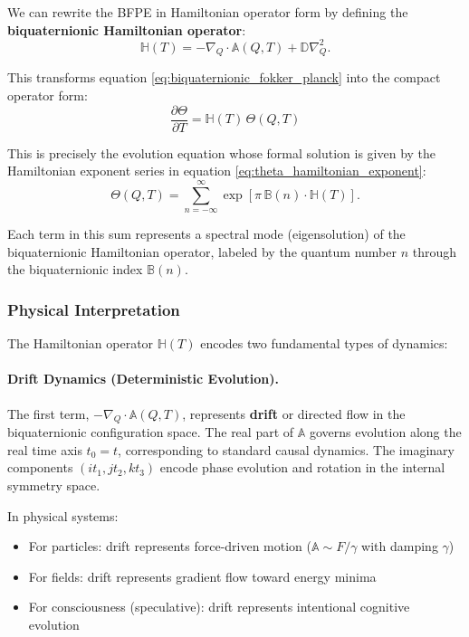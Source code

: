 We can rewrite the BFPE in Hamiltonian operator form by defining the \textbf{biquaternionic Hamiltonian operator}:
\begin{equation}
\mathbb{H}(T) = -\nabla_Q \cdot \mathbb{A}(Q,T)
+ \mathbb{D}\nabla_Q^2.
\label{eq:hamiltonian_fokker_planck}
\end{equation}

This transforms equation \eqref{eq:biquaternionic_fokker_planck} into the compact operator form:
\begin{equation}
\boxed{
\frac{\partial \Theta}{\partial T}
= \mathbb{H}(T)\,\Theta(Q,T)
}
\label{eq:theta_evolution_equation}
\end{equation}

This is precisely the evolution equation whose formal solution is given by the Hamiltonian exponent series in equation \eqref{eq:theta_hamiltonian_exponent}:
\begin{equation}
\Theta(Q, T) = \sum_{n=-\infty}^{\infty} \exp\!\left[\pi\,\mathbb{B}(n) \cdot \mathbb{H}(T)\right].
\label{eq:theta_hamiltonian_solution}
\end{equation}

Each term in this sum represents a spectral mode (eigensolution) of the biquaternionic Hamiltonian operator, labeled by the quantum number $n$ through the biquaternionic index $\mathbb{B}(n)$.

\subsubsection{Physical Interpretation}

The Hamiltonian operator $\mathbb{H}(T)$ encodes two fundamental types of dynamics:

\paragraph{Drift Dynamics (Deterministic Evolution).}
The first term, $-\nabla_Q \cdot \mathbb{A}(Q,T)$, represents \textbf{drift} or directed flow in the biquaternionic configuration space. The real part of $\mathbb{A}$ governs evolution along the real time axis $t_0 = t$, corresponding to standard causal dynamics. The imaginary components $(i t_1, j t_2, k t_3)$ encode phase evolution and rotation in the internal symmetry space.

In physical systems:
\begin{itemize}
\item For particles: drift represents force-driven motion ($\mathbb{A} \sim F/\gamma$ with damping $\gamma$)
\item For fields: drift represents gradient flow toward energy minima
\item For consciousness (speculative): drift represents intentional cognitive evolution
\end{itemize}

